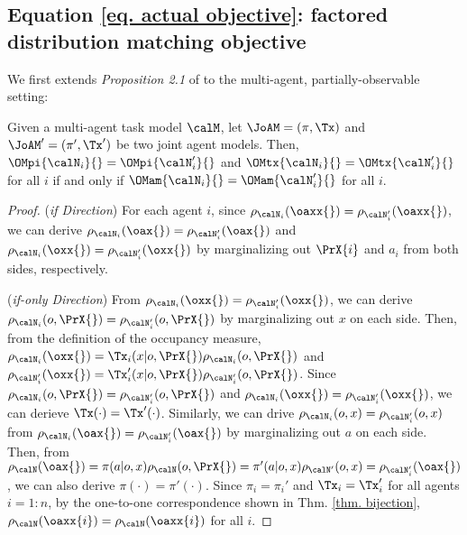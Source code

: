 \subsection{Equation \ref{eq. actual objective}: factored distribution matching objective}
We first extends \textit{Proposition 2.1} of \cite{seo2024idil} to the multi-agent, partially-observable setting:
\begin{lemma}
\label{thm. factorization} Given a multi-agent task model $\calM$, let $\JoAM=(\pi, \Tx)$ and $\JoAM'=(\pi', \Tx')$ be two joint agent models. Then, $\OMpi{\calN_i}{} = \OMpi{\calN_i'}{}$ and $\OMtx{\calN_i}{} = \OMtx{\calN_i'}{}$ for all $i$ if and only if $\OMam{\calN_i}{}=\OMam{\calN_i'}{}$ for all $i$.
\end{lemma}
\begin{proof}
(\textit{if Direction}) For each agent $i$, since $\rho_{\calN_i}(\oaxx{})=\rho_{\calN_i'}(\oaxx{})$, we can derive $\rho_{\calN_i}(\oax{})=\rho_{\calN_i'}(\oax{})$ and $\rho_{\calN_i}(\oxx{})=\rho_{\calN_i'}(\oxx{})$ by marginalizing out $\PrX{i}$ and $a_i$ from both sides, respectively. 

(\textit{if-only Direction}) From $\rho_{\calN_i}(\oxx{})=\rho_{\calN'_i}(\oxx{})$, we can derive $\rho_{\calN_i}(o, \PrX{})=\rho_{\calN'_i}(o, \PrX{})$ by marginalizing out $x$ on each side. Then, from the definition of the occupancy measure, $\rho_{\calN_i}(\oxx{})=\Tx_i(x|o, \PrX{})\rho_{\calN_i}(o, \PrX{})$ and $\rho_{\calN_i'}(\oxx{})=\Tx_i'(x|o, \PrX{})\rho_{\calN_i'}(o, \PrX{})$. Since $\rho_{\calN_i}(o, \PrX{})=\rho_{\calN'_i}(o, \PrX{})$ and $\rho_{\calN_i}(\oxx{})=\rho_{\calN'_i}(\oxx{})$, we can derieve $\Tx(\cdot) = \Tx'(\cdot)$. Similarly, we can drive $\rho_{\calN_i}(o, x)=\rho_{\calN'_i}(o, x)$ from $\rho_{\calN_i}(\oax{})=\rho_{\calN'_i}(\oax{})$ by marginalizing out $a$ on each side. Then, from $\rho_{\calN}(\oax{})=\pi(a|o, x)\rho_{\calN}(o, \PrX{})=\pi'(a|o, x)\rho_{\calN'}(o, x)=\rho_{\calN_i'}(\oax{})$, we can also derive $\pi(\cdot) = \pi'(\cdot)$. Since $\pi_i=\pi_i'$ and $\Tx_i = \Tx_i'$ for all agents $i=1:n$, by the one-to-one correspondence shown in Thm. \ref{thm. bijection}, $\rho_\calN(\oaxx{i}) = \rho_\calN(\oaxx{i})$ for all $i$.
\end{proof}

